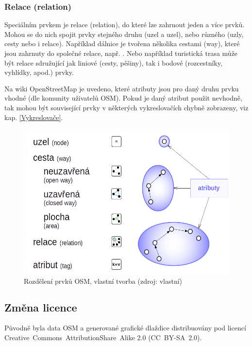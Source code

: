 \subsubsection{Relace (relation) }

Speciálním prvkem je relace (relation), do které lze zahrnout
jeden a více prvků. Mohou se do nich spojit prvky stejného druhu (uzel a uzel),
nebo různého (uzly, cesty nebo i relace).
Například dálnice je tvořena několika cestami (way), které
jsou zahrnuty do společné relace, např. . Nebo například turistická trasa
může být relace sdružující jak liniové 
(cesty, pěšiny), tak i bodové (rozcestníky, vyhlídky, apod.) prvky.

Na wiki OpenStreetMap \cite{OSMfeatures} je uvedeno, které atributy jsou pro daný druhu prvku vhodné (dle komunity uživatelů OSM). Pokud je daný atribut použit nevhodně, tak mohou být související prvky v některých vykreslovačích chybně zobrazeny, viz kap. \ref{Vykreslovače}.
\begin{figure}[hbt]
    \centering
    \includegraphics[scale=0.55]{./pictures/OSMelements.png}
    \caption{Rozdělení prvků OSM, vlastní tvorba (zdroj: vlastní)}
    \label{fig:rozdělení OSM prvků}
\end{figure}


\subsection{Změna licence}
\label{změna licence}

Původně byla data OSM a generované grafické dlaždice distribuovány pod licencí
Creative~Commons~AttributionShare~Alike 2.0 (CC~BY-SA~2.0).

